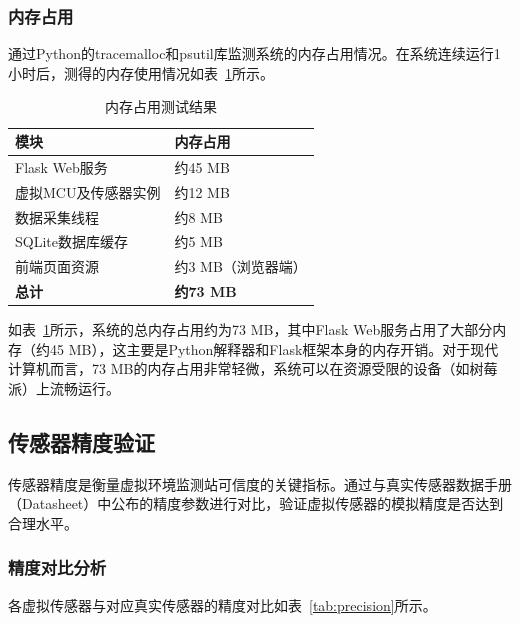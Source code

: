 \documentclass[12pt,a4paper]{ctexart}
\begin{document}
\subsubsection{内存占用}

通过Python的tracemalloc和psutil库监测系统的内存占用情况。在系统连续运行1小时后，测得的内存使用情况如表~\ref{tab:memory}所示。

\begin{table}[H]
    \centering
    \caption{内存占用测试结果}
    \label{tab:memory}
    \begin{tabular}{@{}ll@{}}
        \toprule
        \textbf{模块} & \textbf{内存占用} \\
        \midrule
        Flask Web服务 & 约45 MB \\
        虚拟MCU及传感器实例 & 约12 MB \\
        数据采集线程 & 约8 MB \\
        SQLite数据库缓存 & 约5 MB \\
        前端页面资源 & 约3 MB（浏览器端） \\
        \midrule
        \textbf{总计} & \textbf{约73 MB} \\
        \bottomrule
    \end{tabular}
\end{table}

如表~\ref{tab:memory}所示，系统的总内存占用约为73 MB，其中Flask Web服务占用了大部分内存（约45 MB），这主要是Python解释器和Flask框架本身的内存开销。对于现代计算机而言，73 MB的内存占用非常轻微，系统可以在资源受限的设备（如树莓派）上流畅运行。

\subsection{传感器精度验证}

传感器精度是衡量虚拟环境监测站可信度的关键指标。通过与真实传感器数据手册（Datasheet）中公布的精度参数进行对比，验证虚拟传感器的模拟精度是否达到合理水平。

\subsubsection{精度对比分析}

各虚拟传感器与对应真实传感器的精度对比如表~\ref{tab:precision}所示。
\end{document}
